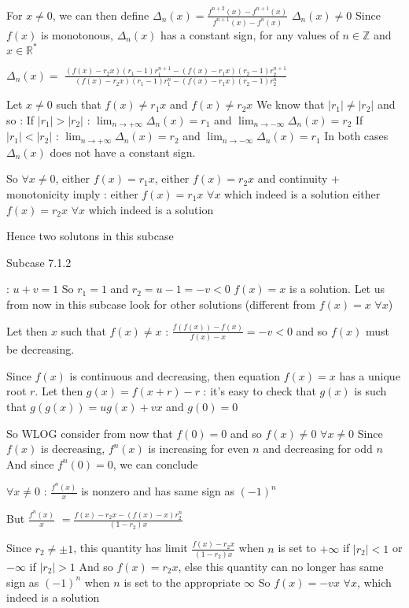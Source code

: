 \begin{solution}
\begin{tcolorbox}
For $x\ne 0$, we can then define $\Delta_n(x)=\frac{f^{n+2}(x)-f^{n+1}(x)}{f^{n+1}(x)-f^{n}(x)}$
$\Delta_n(x)\ne 0$
Since $f(x)$ is monotonous, $\Delta_n(x)$ has a constant sign, for any values of $n\in\mathbb Z$ and $x\in\mathbb R^*$

$\Delta_n(x)=$ $\frac{(f(x)-r_2x)(r_1-1)r_1^{n+1}-(f(x)-r_1x)(r_2-1)r_2^{n+1}}{(f(x)-r_2x)(r_1-1)r_1^{n}-(f(x)-r_1x)(r_2-1)r_2^{n}}$

Let $x\ne 0$ such that $f(x)\ne r_1x$ and $f(x)\ne r_2x$
We know that $|r_1|\ne |r_2|$ and so :
If $|r_1|>|r_2|$ : $\lim_{n\to +\infty}\Delta_n(x)=r_1$ and $\lim_{n\to -\infty}\Delta_n(x)=r_2$
If $|r_1|<|r_2|$ : $\lim_{n\to +\infty}\Delta_n(x)=r_2$ and $\lim_{n\to -\infty}\Delta_n(x)=r_1$
In both cases $\Delta_n(x)$ does not have a constant sign.

So $\forall x\ne 0$, either $f(x)=r_1x$, either $f(x)=r_2x$ and continuity + monotonicity imply :
either $f(x)=r_1x$ $\forall x$ which indeed is a solution
either $f(x)=r_2x$ $\forall x$ which indeed is a solution

Hence two solutons in this subcase

\begin{bolded}Subcase 7.1.2\end{bolded} : $u+v=1$
So $r_1=1$ and $r_2=u-1=-v<0$
$f(x)=x$ is a solution.
Let us from now in this subcase look for other solutions (different from $f(x)=x$ $\forall x$)

Let then $x$ such that $f(x)\ne x$ : $\frac{f(f(x))-f(x)}{f(x)-x}=-v<0$ and so $f(x)$ must be decreasing.

Since $f(x)$ is continuous and decreasing, then equation $f(x)=x$ has a unique root $r$.
Let then $g(x)=f(x+r)-r$ : it's easy to check that $g(x)$ is such that $g(g(x))=ug(x)+vx$ and $g(0)=0$

So WLOG consider from now that $f(0)=0$ and so $f(x)\ne 0$ $\forall x\ne 0$
Since $f(x)$ is decreasing, $f^{n}(x)$ is increasing for even $n$ and decreasing for odd $n$
And since $f^{n}(0)=0$, we can conclude

$\forall x\ne 0$ : $\frac{f^{n}(x)}x$ is nonzero and has same sign as $(-1)^n$

But $\frac{f^{n}(x)}x$ $=\frac{f(x)-r_2x-(f(x)-x)r_2^n}{(1-r_2)x}$

Since $r_2\ne \pm 1$, this quantity has limit  $\frac{f(x)-r_2x}{(1-r_2)x}$ when $n$ is set to $+\infty$ if $|r_2|<1$ or $-\infty$ if $|r_2|>1$
And so $f(x)=r_2x$, else this quantity can no longer has same sign as $(-1)^n$ when $n$ is set to the appropriate $\infty$
So $f(x)=-vx$ $\forall x$, which indeed is a solution


\end{tcolorbox}
\end{solution}

